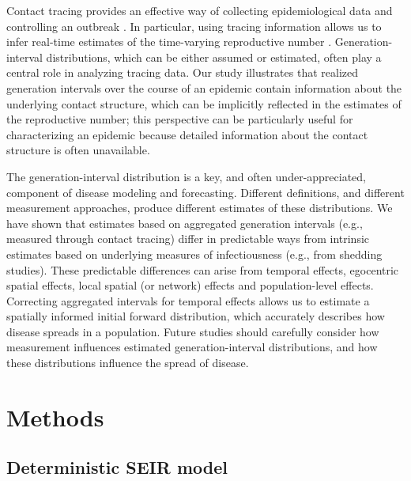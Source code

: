 \documentclass[12pt]{article}
\begin{document}
Contact tracing provides an effective way of collecting epidemiological data and controlling an outbreak \citep{clarke1998contact, eames2003contact, donnelly2003epidemiological}.
In particular, using tracing information allows us to infer real-time estimates of the time-varying reproductive number \citep{cauchemez2006estimating, hens2012robust, jewell2012enhancing, soetens2018real}.
Generation-interval distributions, which can be either assumed or estimated, often play a central role in analyzing tracing data.
Our study illustrates that realized generation intervals over the course of an epidemic contain information about the underlying contact structure, which can be implicitly reflected in the estimates of the reproductive number;
this perspective can be particularly useful for characterizing an epidemic because detailed information about the contact structure is often unavailable.

The generation-interval distribution is a key, and often under-appreciated, component of disease modeling and forecasting.
Different definitions, and different measurement approaches, produce different estimates of these distributions.
We have shown that estimates based on aggregated generation intervals (e.g., measured through contact tracing) differ in predictable ways from intrinsic estimates based on underlying measures of infectiousness (e.g., from shedding studies).
These predictable differences can arise from temporal effects, egocentric spatial effects, local spatial (or network) effects and population-level effects.
Correcting aggregated intervals for temporal effects allows us to estimate a spatially informed initial forward distribution, which accurately describes how disease spreads in a population.
Future studies should carefully consider how measurement influences estimated generation-interval distributions, and how these distributions influence the spread of disease.

\section{Methods}

\subsection{Deterministic SEIR model}
\end{document}
